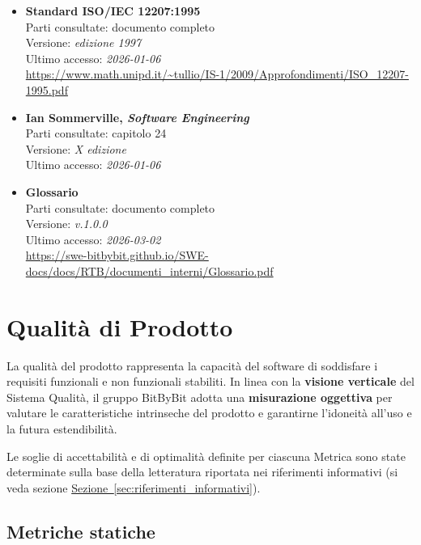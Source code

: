 \documentclass[a4paper,12pt]{article}
\begin{document}
\begin{itemize}
    \item \textbf{Standard ISO/IEC 12207:1995}\\
        Parti consultate: documento completo\\
        Versione: \textit{edizione 1997} \\
        Ultimo accesso: \textit{2026-01-06}\\
        \url{https://www.math.unipd.it/~tullio/IS-1/2009/Approfondimenti/ISO_12207-1995.pdf}
    \item \textbf{Ian Sommerville, \textit{Software Engineering}}\\
        Parti consultate: capitolo 24\\
        Versione: \textit{X edizione}\\
        Ultimo accesso: \textit{2026-01-06}\\
    \item \textbf{Glossario}\\
        Parti consultate: documento completo\\
        Versione: \textit{v.1.0.0}\\
        Ultimo accesso: \textit{2026-03-02}\\
        \url{https://swe-bitbybit.github.io/SWE-docs/docs/RTB/documenti_interni/Glossario.pdf}
\end{itemize}

\section{Qualità di Prodotto}\label{sec:qualità_prodotto}
La qualità del prodotto rappresenta la capacità del software di soddisfare i requisiti funzionali e non funzionali stabiliti. In linea con la \textbf{visione verticale} del Sistema Qualità, il gruppo BitByBit adotta una \textbf{misurazione oggettiva} per valutare le caratteristiche intrinseche del prodotto e garantirne l'idoneità all'uso e la futura estendibilità.

Le soglie di accettabilità e di optimalità definite per ciascuna Metrica sono state determinate sulla base della letteratura riportata nei riferimenti informativi (si veda sezione \hyperref[sec:riferimenti_informativi]{Sezione~\ref*{sec:riferimenti_informativi}}).

\subsection{Metriche statiche}\label{subsec:metriche-statiche}
\end{document}

